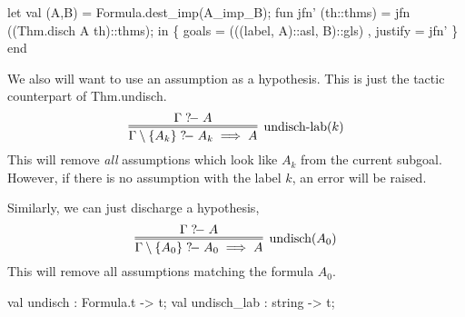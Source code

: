 \nwenddocs{}\endmoddef\nwstartdeflinemarkup{}\nwenddeflinemarkup
let
  val (A,B) = Formula.dest_imp(A_imp_B);
  fun jfn' (th::thms) = jfn ((Thm.disch A th)::thms);
in
  \{ goals = (((label, A)::asl, B)::gls)
  , justify = jfn' \}
end
\nwendcode{}\nwdocspar

\begin{node}
We also will want to use an assumption as a hypothesis. This is just
the tactic counterpart of {\Tt{}Thm.undisch\nwendquote}.
\begin{equation*}
\vcenter{\infer=[\mbox{undisch-lab}(k)]{\Gamma\setminus\{A_{k}\}\gdash A_{k}\implies A}{\Gamma\gdash A}}
\end{equation*}
This will remove \emph{all} assumptions which look like $A_{k}$ from
the current subgoal. However, if there is no assumption with the label
$k$, an error will be raised.

Similarly, we can just discharge a hypothesis,
\begin{equation*}
\vcenter{\infer=[\mbox{undisch}(A_{0})]{\Gamma\setminus\{A_{0}\}\gdash A_{0}\implies A}{\Gamma\gdash A}}
\end{equation*}
This will remove all assumptions matching the formula $A_{0}$.
\end{node}

\nwenddocs{}\plusendmoddef\nwstartdeflinemarkup{}\nwenddeflinemarkup
val undisch : Formula.t -> t;
val undisch_lab : string -> t;
\nwendcode{}\nwdocspar

